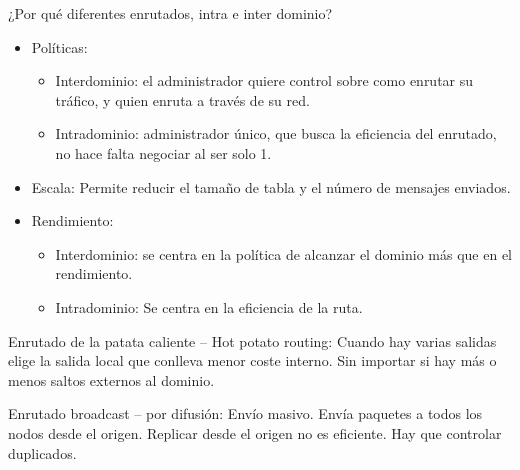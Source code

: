 \documentclass[12pt, twoside, openright]{report} %
\begin{document}
\pagebreak
¿Por qué diferentes enrutados, intra e inter dominio?

\begin{itemize}
	\item Políticas:

	      \begin{itemize}
		      \item Interdominio: el administrador quiere control sobre como enrutar
		            su tráfico, y quien enruta a través de su red.
		      \item Intradominio: administrador único, que busca la eficiencia del
		            enrutado, no hace falta negociar al ser solo 1.
	      \end{itemize}
	\item Escala: Permite reducir el tamaño de tabla y el número de mensajes
	      enviados.
	\item Rendimiento:

	      \begin{itemize}
		      \item Interdominio: se centra en la política de alcanzar el dominio
		            más que en el rendimiento.
		      \item Intradominio: Se centra en la eficiencia de la ruta.
	      \end{itemize}
\end{itemize}

Enrutado de la patata caliente -- Hot potato routing: Cuando hay
varias salidas elige la salida local que conlleva menor coste
interno. Sin importar si hay más o menos saltos externos al dominio.

Enrutado broadcast -- por difusión: Envío masivo. Envía paquetes a
todos los nodos desde el origen. Replicar desde el origen no es
eficiente. Hay que controlar duplicados.
\end{document}
